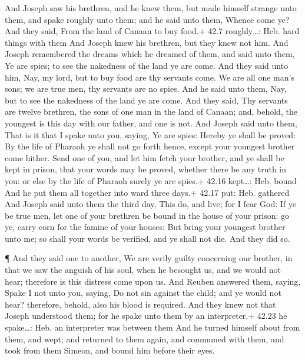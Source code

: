  And Joseph saw his brethren, and he knew them, but made
himself strange unto them, and spake roughly unto them; and he said unto
them, Whence come ye? And they said, From the land of Canaan to buy
food.+ 42.7 roughly\ldots: Heb. hard things with them  And
Joseph knew his brethren, but they knew not him.  And Joseph
remembered the dreams which he dreamed of them, and said unto them, Ye
are spies; to see the nakedness of the land ye are come. 
And they said unto him, Nay, my lord, but to buy food are thy servants
come.  We are all one man's sons; we are true men, thy
servants are no spies.  And he said unto them, Nay, but to
see the nakedness of the land ye are come.  And they said,
Thy servants are twelve brethren, the sons of one man in the land of
Canaan; and, behold, the youngest is this day with our father, and one
is not.  And Joseph said unto them, That is it that I spake
unto you, saying, Ye are spies:  Hereby ye shall be proved:
By the life of Pharaoh ye shall not go forth hence, except your youngest
brother come hither.  Send one of you, and let him fetch
your brother, and ye shall be kept in prison, that your words may be
proved, whether there be any truth in you: or else by the life of
Pharaoh surely ye are spies.+ 42.16 kept\ldots: Heb. bound 
And he put them all together into ward three days.+ 42.17 put: Heb.
gathered  And Joseph said unto them the third day, This do,
and live; for I fear God:  If ye be true men, let one of
your brethren be bound in the house of your prison: go ye, carry corn
for the famine of your houses:  But bring your youngest
brother unto me; so shall your words be verified, and ye shall not die.
And they did so.

 ¶ And they said one to another, We are verily guilty
concerning our brother, in that we saw the anguish of his soul, when he
besought us, and we would not hear; therefore is this distress come upon
us.  And Reuben answered them, saying, Spake I not unto
you, saying, Do not sin against the child; and ye would not hear?
therefore, behold, also his blood is required.  And they
knew not that Joseph understood them; for he spake unto them by an
interpreter.+ 42.23 he spake\ldots: Heb. an interpreter was between them
 And he turned himself about from them, and wept; and
returned to them again, and communed with them, and took from them
Simeon, and bound him before their eyes.

